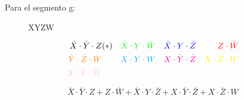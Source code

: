 Para el segmento g:
\begin{figure}[H]
  \begin{center}
    \begin{Karnaugh}{X}{Y}{Z}{W}
    \end{Karnaugh}
  \end{center}
\end{figure}

\begin{align*}
  \bar{X} \cdot \bar{Y} \cdot Z & (*) &
  \color{green} \bar{X} \cdot Y \cdot \bar{W} &  &
  \color{blue} \bar{X} \cdot Y \cdot \bar{Z} &  &
  \color{red} Z \cdot \bar{W} & \\
  \color{orange} \bar{Y} \cdot \bar{Z} \cdot W &  &
  \color{cyan} X \cdot Y \cdot W &  &
  \color{magenta} X \cdot \bar{Y} \cdot \bar{Z} &  &
  \color{yellow} X \cdot \bar{Z} \cdot W & \\
  \color{pink} X \cdot \bar{Y} \cdot \bar{W}
\end{align*}

\begin{equation*}
  \bar{X} \cdot \bar{Y} \cdot Z +
  Z \cdot \bar{W} +
  \bar{X} \cdot Y \cdot \bar{Z} +
  X \cdot \bar{Y} \cdot \bar{Z} +
  X \cdot \bar{Z} \cdot W
\end{equation*}
